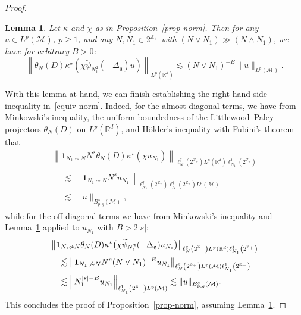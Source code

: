 \documentclass[10pt]{amsart}
\newtheorem{lemm}[theo]{Lemma}\newtheorem{prop}[theo]{Proposition}\newtheorem{coro}[theo]{Corollary}\newtheorem{conj}[theo]{Conjecture}
\theoremstyle{definition}\newtheorem{defi}[theo]{Definition}\newtheorem{rema}[theo]{Remark}\newtheorem{exam}[theo]{Example}\newtheorem{exem}[theo]{Example}\newtheorem{nota}[theo]{Notation}
\newcommand{\Z}{\mathbb{Z}}
\newcommand{\R}{\mathbb{R}}
\newcommand{\ind}{\mathbf{1}}
\newcommand{\M}{\mathcal{M}}
\newcommand{\g}{\mathfrak{g}}
\newcommand{\Dlg}{\Delta_{\g}}
\newcommand{\kk}{\kappa}
\newcommand{\les}{\lesssim}
\begin{document}
\begin{proof}
\begin{lemm}\label{LEM:Picasso}
Let $\kk$ and $\chi$ as in Proposition~\ref{prop-norm}. Then for any $u\in L^p(\M)$, $p\geq 1$, and any $N,N_1\in 2^{\Z_+}$ with $(N\vee N_1)\gg (N\wedge N_1)$, we have for arbitrary $B>0$:
\begin{equation}\label{estim-key-norm}
\left\|\theta_N(D)\kk^{\star}\left(\chi\widetilde{\psi}_{N_1^2}(-\Dlg)u\right)\right\|_{L^p(\R^d)}\les (N\vee N_1)^{-B}\|u\|_{L^p(\M)}.
\end{equation}
\end{lemm}

With this lemma at hand, we can finish establishing the right-hand side inequality in~\eqref{equiv-norm}. Indeed, for the almost diagonal terms, we have from Minkowski's inequality, the uniform boundedness of the Littlewood--Paley projectors $\theta_N(D)$ on $L^p(\R^d)$, and H\"older's inequality with Fubini's theorem that
\begin{multline*}
\left\|\ind_{N_1\sim N}N^s\theta_N(D)\kk^\star(\chi u_{N_1})\right\|_{\ell^q_N\left(2^{\Z_+}\right) L^p\left(\R^d\right)\ell^1_{N_1}\left(2^{\Z_+}\right)}\\
\begin{aligned}
&\les \left\|\ind_{N_1\sim N}N^s u_{N_1}\right\|_{\ell^q_{N_1}\left(2^{\Z_+}\right)\ell^q_{N}\left(2^{\Z_+}\right) L^p(\M)}\\
&\les \|u\|_{B^s_{p,q}(\M)},
\end{aligned}
\end{multline*}
while for the off-diagonal terms we have from Minkowski's inequality and Lemma~\ref{LEM:Picasso} applied to $u_{N_1}$ with $B>2|s|$:
\begin{multline*}
\big\|\ind_{N_1\not\sim N}\theta_N(D)\kk^{\star}\big(\chi\widetilde{\psi}_{N_1^2}(-\Dlg)u_{N_1}\big)\big\|_{\ell^q_N\left(2^{\Z_+}\right)L^p(\R^d)\ell^1_{N_1}\left(2^{\Z_+}\right)}\\
\begin{aligned}
&\les \left\|\ind_{N_1\,\not\,\sim N}N^s(N\vee N_1)^{-B}u_{N_1}\right\|_{\ell^q_{N}\left(2^{\Z_+}\right)L^p(\M)\ell^1_{N_1}\left(2^{\Z_+}\right)}\\
&\les \left\|N_1^{|s|-B}u_{N_1}\right\|_{\ell^1_{N_1}\left(2^{\Z_+}\right)L^p(\M)} \les \|u\|_{B^s_{p,q}(\M)}.
\end{aligned}
\end{multline*}
This concludes the proof of Proposition~\ref{prop-norm}, assuming Lemma~\ref{LEM:Picasso}.
\end{proof}
\end{document}

